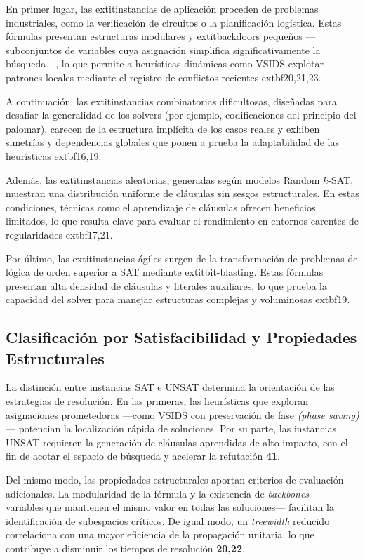En primer lugar, las 	extit{instancias de aplicación} proceden de problemas industriales, como la verificación de circuitos o la planificación logística. Estas fórmulas presentan estructuras modulares y 	extit{backdoors} pequeños —subconjuntos de variables cuya asignación simplifica significativamente la búsqueda—, lo que permite a heurísticas dinámicas como VSIDS explotar patrones locales mediante el registro de conflictos recientes 	extbf{20,21,23}.

A continuación, las 	extit{instancias combinatorias dificultosas}, diseñadas para desafiar la generalidad de los solvers (por ejemplo, codificaciones del principio del palomar), carecen de la estructura implícita de los casos reales y exhiben simetrías y dependencias globales que ponen a prueba la adaptabilidad de las heurísticas 	extbf{16,19}.

Además, las 	extit{instancias aleatorias}, generadas según modelos Random $k$-SAT, muestran una distribución uniforme de cláusulas sin sesgos estructurales. En estas condiciones, técnicas como el aprendizaje de cláusulas ofrecen beneficios limitados, lo que resulta clave para evaluar el rendimiento en entornos carentes de regularidades 	extbf{17,21}.

Por último, las 	extit{instancias ágiles} surgen de la transformación de problemas de lógica de orden superior a SAT mediante 	extit{bit-blasting}. Estas fórmulas presentan alta densidad de cláusulas y literales auxiliares, lo que prueba la capacidad del solver para manejar estructuras complejas y voluminosas 	extbf{19}.


\subsection{Clasificación por Satisfacibilidad y Propiedades Estructurales}
La distinción entre instancias SAT e UNSAT determina la orientación de las estrategias de resolución. En las primeras, las heurísticas que exploran asignaciones prometedoras —como VSIDS con preservación de fase\textit{ (phase saving)}— potencian la localización rápida de soluciones. Por su parte, las instancias UNSAT requieren la generación de cláusulas aprendidas de alto impacto, con el fin de acotar el espacio de búsqueda y acelerar la refutación \textbf{41}.

Del mismo modo, las propiedades estructurales aportan criterios de evaluación adicionales. La modularidad de la fórmula y la existencia de \textit{backbones} —variables que mantienen el mismo valor en todas las soluciones— facilitan la identificación de subespacios críticos. De igual modo, un \textit{treewidth} reducido correlaciona con una mayor eficiencia de la propagación unitaria, lo que contribuye a disminuir los tiempos de resolución \textbf{20,22}.

